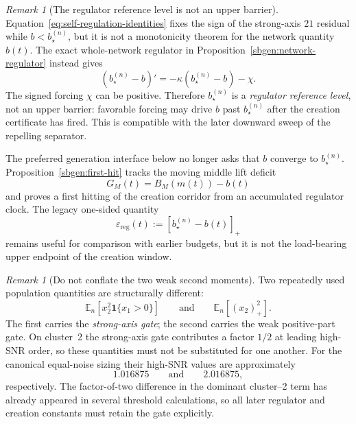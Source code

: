 \documentclass{article} %
\theoremstyle{plain}
\theoremstyle{definition}
\theoremstyle{remark}
\newtheorem{remark}[theorem]{Remark}
\begin{document}
\begin{remark}[The regulator reference level is not an upper barrier]
\label{rem:self-regulation-not-monotonicity}
Equation~\eqref{eq:self-regulation-identities} fixes the sign of the
strong-axis $21$ residual while $b<b_\star^{(n)}$, but it is not a
monotonicity theorem for the network quantity $b(t)$.  The exact whole-network
regulator in Proposition~\ref{sbgen:network-regulator} instead gives
\[
(b_\star^{(n)}-b)'=-\kappa(b_\star^{(n)}-b)-\chi.
\]
The signed forcing $\chi$ can be positive.  Therefore $b_\star^{(n)}$ is a
\emph{regulator reference level}, not an upper barrier: favorable forcing may
drive $b$ past $b_\star^{(n)}$ after the creation certificate has fired.
This is compatible with the later downward sweep of the repelling separator.

The preferred generation interface below no longer asks that $b$ converge to
$b_\star^{(n)}$.  Proposition~\ref{sbgen:first-hit} tracks the moving middle
lift deficit
\[
G_M(t)=B_M(m(t))-b(t)
\]
and proves a first hitting of the creation corridor from an accumulated
regulator clock.  The legacy one-sided quantity
\[
\boxed{
\varepsilon_{\mathrm{reg}}(t)
:=
[b_\star^{(n)}-b(t)]_+
}
\tag{regulation-deficit}\label{eq:regulation-deficit}
\]
remains useful for comparison with earlier budgets, but it is not the
load-bearing upper endpoint of the creation window.
\end{remark}

\begin{remark}[Do not conflate the two weak second moments]
\label{rem:strong-gated-vs-positivepart}
Two repeatedly used population quantities are structurally different:
\[
\mathbb E_n[x_2^2\mathbf 1\{x_1>0\}]
\qquad\text{and}\qquad
\mathbb E_n[(x_2)_+^2].
\]
The first carries the \emph{strong-axis gate}; the second carries the weak
positive-part gate.  On cluster~2 the strong-axis gate contributes a factor
$1/2$ at leading high-SNR order, so these quantities must not be substituted
for one another.  For the canonical equal-noise sizing their high-SNR values
are approximately
\[
1.016875
\qquad\text{and}\qquad
2.016875,
\]
respectively.  The factor-of-two difference in the dominant cluster--2 term
has already appeared in several threshold calculations, so all later
regulator and creation constants must retain the gate explicitly.
\end{remark}
\end{document}
